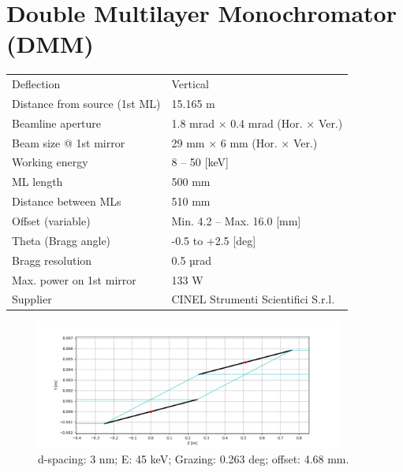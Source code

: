 \section{Double Multilayer Monochromator (DMM)}
\vspace*{-\baselineskip}
\begin{center}
\begin{table} [ht]
\small
\begin{tabular}[bhp]{|p{} | p{}|}
\hline
Deflection & Vertical \\
Distance from source (1st ML) & 15.165 m \\
Beamline aperture & 1.8 mrad × 0.4 mrad (Hor. × Ver.) \\
Beam size @ 1st mirror & 29 mm × 6 mm (Hor. × Ver.) \\
Working energy & 8 – 50 [keV] \\
ML length & 500 mm \\
Distance between MLs & 510 mm \\
Offset (variable) & Min. 4.2 – Max. 16.0 [mm] \\
Theta (Bragg angle) & -0.5 to +2.5 [deg] \\
Bragg resolution & 0.5 µrad \\
Max. power on 1st mirror & 133 W \\
Supplier & CINEL Strumenti Scientifici S.r.l. \\
\hline
\end{tabular}
\label{tab:DMM_general}
\end{table}
\end{center}

\setlength{\belowcaptionskip}{-15pt}
\vspace*{-\baselineskip}

\begin{figure} [!ht]
\centering
\includegraphics[width=0.9\textwidth]{./../figures/operation/DMM_mirrors_d3_E45_gr0.263_offset4.68.png}
\caption{\label{fig:DMM_mirrors_45keV} d-spacing: 3 nm; E: 45 keV; Grazing: 0.263 deg; offset: 4.68 mm.}
\end{figure}

